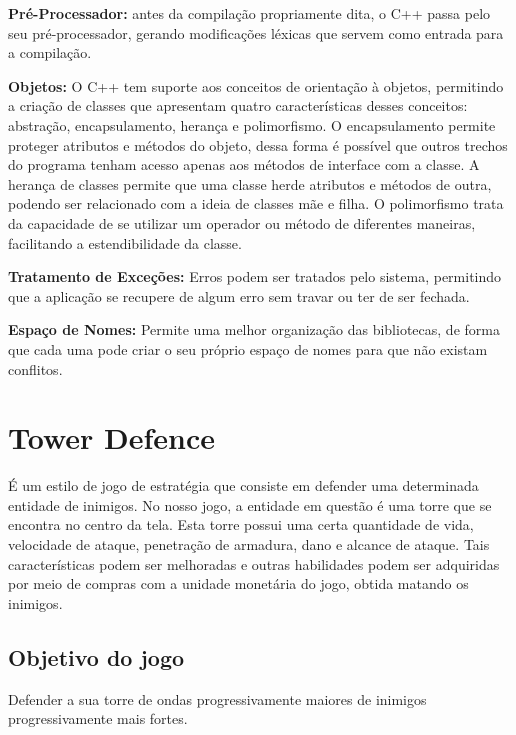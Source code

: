 \documentclass[rel_mlp]{iiufrgs}
\begin{document}
	\textbf{	Pré-Processador:} antes da compilação propriamente dita, o C++ passa pelo seu pré-processador, gerando modificações léxicas que servem como entrada para a compilação.

	\textbf{Objetos:} O C++ tem suporte aos conceitos de orientação à objetos, permitindo a criação de classes que apresentam quatro características desses conceitos: abstração, encapsulamento, herança e polimorfismo. O encapsulamento permite proteger atributos e métodos do objeto, dessa forma  é possível que outros trechos do programa tenham acesso apenas aos métodos de interface com a classe.	A herança de classes permite que uma classe herde atributos e métodos de outra, podendo ser relacionado com a ideia de classes mãe e filha. O polimorfismo trata da capacidade de se utilizar um operador ou método de diferentes maneiras, facilitando a estendibilidade da classe.

	\textbf{	Tratamento de Exceções:} Erros podem ser tratados pelo sistema, permitindo que a aplicação se recupere de algum erro sem travar ou ter de ser fechada.

	\textbf{Espaço de Nomes:} Permite uma melhor organização das bibliotecas, de forma que cada uma pode criar o seu próprio espaço de nomes para que não existam conflitos.

\chapter{Tower Defence} \label{Tower Defence}
É um estilo de jogo de estratégia que consiste em defender uma determinada entidade de inimigos. No nosso jogo, a entidade em questão é uma torre que se encontra no centro da tela. Esta torre possui uma certa quantidade de vida, velocidade de ataque, penetração de armadura, dano e alcance de ataque. Tais características podem ser melhoradas e outras habilidades podem ser adquiridas por meio de compras com a unidade monetária do jogo, obtida matando os inimigos.

\section{Objetivo do jogo}
Defender a sua torre de ondas progressivamente maiores de inimigos progressivamente mais fortes.
\end{document}
